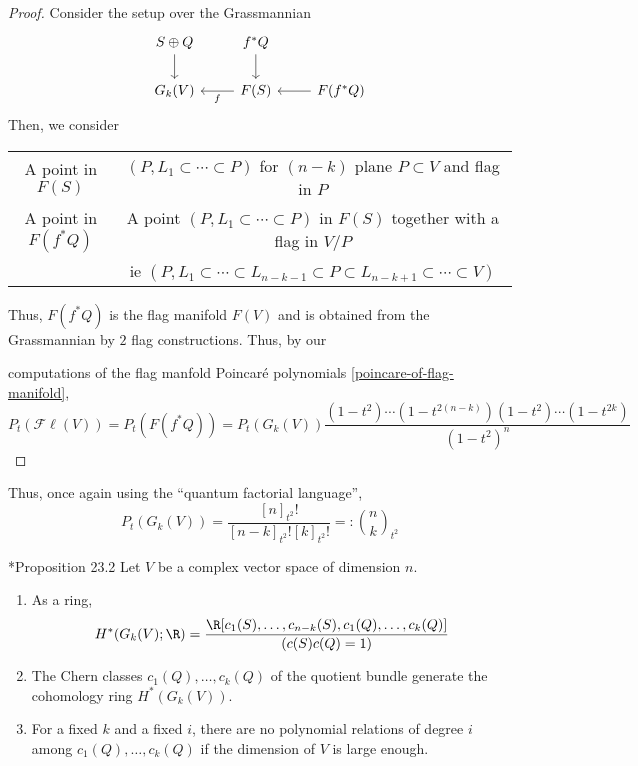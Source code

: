 \documentclass[11pt,leqno,oneside]{amsbook}
\numberwithin{thm}{section}
\newcommand{\Fl}{\mathcal{F\ell}}
\begin{document}
\begin{proof}
  Consider the setup over the Grassmannian
  \[
    \begin{tikzcd}
      S \oplus Q \ar[d]& f^*Q \ar[d]\\
      G_k(V) & \ar[l,"f"] F(S) & \ar[l] F(f^*Q)
    \end{tikzcd}
  \]
  Then, we consider
  \begin{center}
    \begin{tabular}{c|c}
      A point in \(F(S)\)&\((P, L_1 \subset \cdots \subset P)\) for
                           \((n-k)\) plane \(P \subset V\) and flag in
                           \(P\)\\
      A point in \(F(f^*Q)\) & A point \((P,L_1 \subset \cdots \subset
                               P)\) in \(F(S)\) together with a flag
                               in \(V/P\)\\
      & ie \((P, L_1 \subset \cdots \subset L_{n-k-1} \subset P
        \subset L_{n-k+1} \subset \cdots \subset V)\)
    \end{tabular}
  \end{center}
  Thus, \(F(f^*Q)\) is the flag manifold \(F(V)\) and is obtained from
  the Grassmannian by \(2\) flag constructions. Thus, by our

  computations of the flag manfold Poincar\'{e} polynomials \ref{poincare-of-flag-manifold}, \[
    P_t(\Fl(V)) = P_t(F(f^*Q)) = P_t(G_k(V)) \frac{(1-t^2) \cdots (1-t^{2(n-k)})(1-t^2)
    \cdots (1-t^{2k})}{(1-t^2)^{n}}
  \]
\end{proof}
\begin{rmk}
  Thus, once again using the ``quantum factorial language'', \[
    P_t(G_k(V)) = \frac{[n]_{t^2}!}{[n-k]_{t^2}! [k]_{t^2}!} =: \binom{n}{k}_{t^2}
  \]
\end{rmk}
\begin{prop}
  \cite{bott-tu}*{Proposition 23.2} Let \(V\) be a complex vector
  space of dimension \(n\).
  \begin{enumerate}
  \item As a ring, \[
      H^*(G_k(V);\R) = \frac{\R[c_1(S), \ldots, c_{n-k}(S), c_1(Q),
        \ldots, c_k(Q)]}{(c(S)c(Q)=1)}
    \]
  \item The Chern classes \(c_1(Q) ,\ldots, c_k(Q)\) of the quotient
    bundle generate the cohomology ring \(H^*(G_k(V))\).
  \item For a fixed \(k\) and a fixed \(i\), there are no polynomial
    relations of degree \(i\) among \(c_1(Q), \ldots, c_k(Q)\) if the
    dimension of \(V\) is large enough.
  \end{enumerate}
\end{prop}
\end{document}
